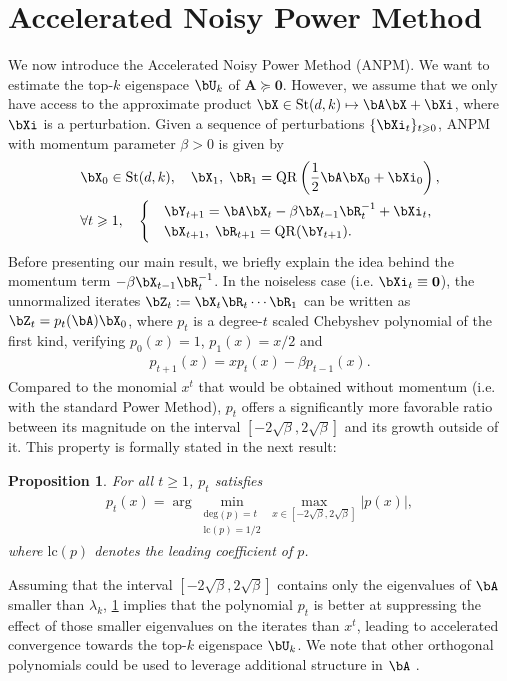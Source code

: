 \documentclass{article}
\theoremstyle{plain}
\newtheorem{proposition}[theorem]{Proposition}
\theoremstyle{definition}
\theoremstyle{remark}
\begin{document}
\section{Accelerated Noisy Power Method}\label{sec:napm}

We now introduce the Accelerated Noisy Power Method (ANPM). We want to estimate the top-$k$ eigenspace $\bU_k$ of $\mathbf{A}\succeq \mathbf{0}$. However, we assume that we only have access to the approximate product $\bX\in\mathrm{St}(d,k)\mapsto\bA\bX+\bXi$, where $\bXi$ is a perturbation. Given a sequence of perturbations $\{\bXi_t\}_{t\geqslant 0}$, ANPM with momentum parameter $\beta > 0$ is given by
\begin{align}\label{eq:anpm}
  & \bX_0 \in \mathrm{St}(d, k), \quad \bX_1,\; \bR_1 = \mathrm{QR}\left(\frac{1}{2}\bA \bX_0 + \bXi_0\right), \nonumber \\
  & \forall t \geqslant 1, \quad \begin{cases}
    & \bY_{t+1} = \bA \bX_t - \beta \bX_{t-1}\bR_t^{-1} + \bXi_t, \\
    & \bX_{t+1}, \;\bR_{t+1} = \mathrm{QR}(\bY_{t+1}).
  \end{cases}
\end{align}
Before presenting our main result, we briefly explain the idea behind the momentum term $-\beta \bX_{t-1}\bR_t^{-1}$. In the noiseless case (i.e. $\bXi_t \equiv \mathbf{0}$), the unnormalized iterates $\bZ_t := \bX_t \bR_t \cdots \bR_1$ can be written as $\bZ_t = p_t(\bA)\bX_0$, where $p_t$ is a degree-$t$ scaled Chebyshev polynomial of the first kind, verifying $p_0(x) = 1$, $p_1(x) = x/2$ and
\begin{align}\label{eq:cheby_rec}
   p_{t+1}(x) = x p_t(x) - \beta p_{t-1}(x).
\end{align}
Compared to the monomial $x^t$ that would be obtained without momentum (i.e. with the standard Power Method), $p_t$ offers a significantly more favorable ratio between its magnitude on the interval $[-2\sqrt{\beta}, 2\sqrt{\beta}]$ and its growth outside of it. This property is formally stated in the next result:
\begin{proposition}\label{prop:min_inf_norm}
  For all $t\geqslant 1$, $p_t$ satisfies
  \begin{align*}
    p_t(x) = \arg \min_{\substack{\mathrm{deg}(p) = t \\ \mathrm{lc}(p) = 1/2}} \max_{x \in [-2\sqrt{\beta}, 2\sqrt{\beta}]} |p(x)|,
  \end{align*}
  where $\mathrm{lc}(p)$ denotes the leading coefficient of $p$.
\end{proposition}
Assuming that the interval $[-2\sqrt{\beta}, 2\sqrt{\beta}]$ contains only the eigenvalues of $\bA$ smaller than $\lambda_k$, \cref{prop:min_inf_norm} implies that the polynomial $p_t$ is better at suppressing the effect of those smaller eigenvalues on the iterates than $x^t$, leading to accelerated convergence towards the top-$k$ eigenspace $\bU_k$. We note that other orthogonal polynomials could be used to leverage additional structure in $\bA$ \citep{berthier2020accelerated}.
\end{document}
